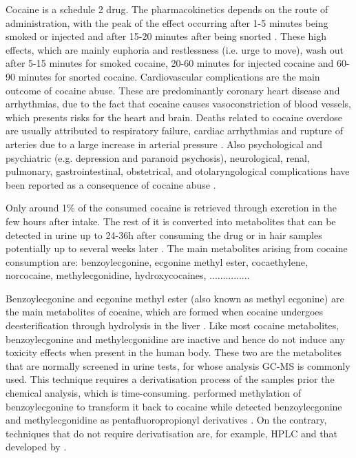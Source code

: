 Cocaine is a schedule 2 drug. 
%
The pharmacokinetics depends on the route of administration, with the peak of the effect occurring after 1-5 minutes being smoked or injected and after 15-20 minutes after being snorted  \cite{lange2001cardiovascular}.
%
These high effects, which are mainly euphoria and restlessness (i.e. urge to move), wash out after 5-15 minutes for smoked cocaine, 20-60 minutes for injected cocaine and 60-90 minutes for snorted cocaine.
%
%
Cardiovascular complications are the main outcome of cocaine abuse.
%
These are predominantly coronary heart disease and arrhythmias, due to the fact that cocaine causes vasoconstriction of blood vessels, which presents risks for the heart and brain.
%
Deaths related to cocaine overdose are usually attributed to respiratory failure, cardiac arrhythmias and rupture of arteries due to a large increase in arterial pressure \cite{lange2001cardiovascular,cregler1986medical}.
%
Also psychological and psychiatric (e.g. depression and paranoid psychosis), neurological, renal, pulmonary, gastrointestinal, obstetrical, and otolaryngological complications have been reported as a consequence of cocaine abuse \cite{glauser2007overview}.
%




Only around 1\% of the consumed cocaine is retrieved through excretion in the few hours after intake.
%
The rest of it is converted into %
metabolites that can be detected in urine up to 24-36h after consuming the drug or in hair samples potentially up to several weeks later \cite{cone1991testing}. 
%
The main metabolites arising from cocaine consumption are: 
benzoylecgonine, 
ecgonine methyl ester, 
cocaethylene,
norcocaine,
methylecgonidine,
hydroxycocaines, 
...............


Benzoylecgonine and %
ecgonine methyl ester (also known as methyl ecgonine)
are the main metabolites of cocaine, which  are formed when cocaine undergoes deesterification through hydrolysis in the liver \cite{shimomura2019cocaine}.
%
Like most cocaine metabolites, benzoylecgonine and methylecgonidine are inactive and hence do not induce any toxicity effects when present in the human body.
%
These two are the metabolites that are normally screened in urine tests, for whose analysis GC-MS is commonly used. This technique requires a derivatisation process of the samples prior the chemical analysis, which is time-consuming.
\citeauthor{ambre1988urinary}  performed methylation of benzoylecgonine to transform it back to cocaine 
while
\citeauthor{fleming2010quantitation} detected benzoylecgonine and methylecgonidine as pentafluoropropionyl derivatives
\cite{ambre1988urinary,fleming2010quantitation}.
%
On the contrary, techniques that do not require derivatisation are, for example, HPLC and that developed by  \citeauthor{hezinova2012simultaneous}  
\cite{antonilli2001analysis,hezinova2012simultaneous}.


